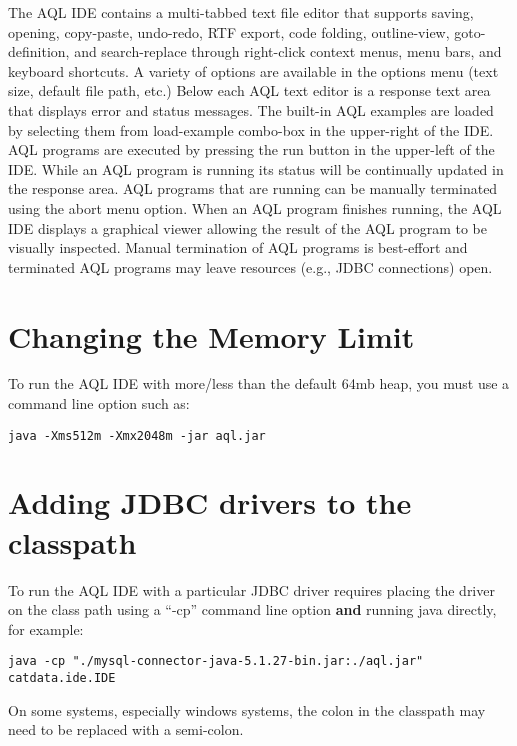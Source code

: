 \documentclass[10pt]{book}
\begin{document}

The AQL IDE contains a multi-tabbed text file editor that supports saving, opening, copy-paste, undo-redo, RTF export, code folding, outline-view, goto-definition, and search-replace through right-click context menus, menu bars, and keyboard shortcuts.  A variety of options are available in the options menu (text size, default file path, etc.)  Below each AQL text editor is a response text area that displays error and status messages.  The built-in AQL examples are loaded by selecting them from load-example combo-box in the upper-right of the IDE.  AQL programs are executed by pressing the run button in the upper-left of the IDE.  While an AQL program is running its status will be continually updated in the response area.  AQL programs that are running can be manually terminated using the abort menu option.   When an AQL program finishes running, the AQL IDE displays a graphical viewer allowing the result of the AQL program to be visually inspected.  Manual termination of AQL programs is best-effort and terminated AQL programs may leave resources (e.g., JDBC connections) open.

\section{Changing the Memory Limit}

To run the AQL IDE with more/less than the default 64mb heap, you must use a command line option such as:
\begin{verbatim}
java -Xms512m -Xmx2048m -jar aql.jar
\end{verbatim}

\section{Adding JDBC drivers to the classpath}

To run the AQL IDE with a particular JDBC driver requires placing the driver on the class path using a ``-cp'' command line option {\bf and} running java directly, for example:
\begin{verbatim}
java -cp "./mysql-connector-java-5.1.27-bin.jar:./aql.jar" catdata.ide.IDE 
\end{verbatim}

On some systems, especially windows systems, the colon in the classpath may need to be replaced with a semi-colon.
\end{document}
